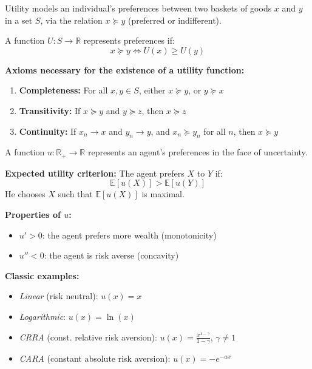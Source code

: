 \begin{f}
	Utility models an individual's preferences between two baskets of goods \(x\) and \(y\) in a set \(S\), via the relation \(x \succcurlyeq y\) (preferred or indifferent).
	
	A function \(U: S \rightarrow \mathbb{R}\) represents preferences if:
	\[
	x \succcurlyeq y \iff U(x) \geq U(y)
	\]
	
	\textbf{Axioms necessary for the existence of a utility function:}
	\begin{enumerate}
		\item \textbf{Completeness:} For all \(x, y \in S\), either \(x \succcurlyeq y\), or \(y \succcurlyeq x\)
		\item \textbf{Transitivity:} If \(x \succcurlyeq y\) and \(y \succcurlyeq z\), then \(x \succcurlyeq z\)
		\item \textbf{Continuity:} If \(x_n \to x\) and \(y_n \to y\), and \(x_n \succcurlyeq y_n\) for all \(n\), then \(x \succcurlyeq y\)
	\end{enumerate}
	
\end{f}


\begin{f}
	A function \(u: \mathbb{R}_+ \rightarrow \mathbb{R}\) represents an agent's preferences in the face of uncertainty.
	
	\textbf{Expected utility criterion:} The agent prefers \(X\) to \(Y\) if:
	\[
	\mathbb{E}[u(X)] > \mathbb{E}[u(Y)]
	\]
	He chooses \(X\) such that \(\mathbb{E}[u(X)]\) is maximal.
	
	\textbf{Properties of \(u\):}
	\begin{itemize}
		\item \(u'\! > 0\): the agent prefers more wealth (monotonicity)
		\item \(u'' < 0\): the agent is risk averse (concavity)
	\end{itemize}
	
	\textbf{Classic examples:}
	\begin{itemize}
		\item \textit{Linear} (risk neutral): \(u(x) = x\)
		\item \textit{Logarithmic}: \(u(x) = \ln(x)\)
		\item \textit{CRRA}  (const. relative risk aversion): \(u(x) = \frac{x^{1 - \gamma}}{1 - \gamma}\), \(\gamma \ne 1\)
		\item \textit{CARA}  (constant absolute risk aversion): \(u(x) = -e^{-a x}\)
	\end{itemize}
	
\end{f}

